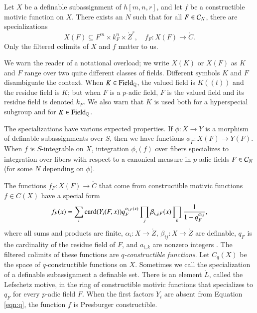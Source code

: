 Let $X$ be a definable subassignment of $h[m,n,r]$, and let $f$ be a
constructible motivic function on $X$.  There exists an $N$ such that
for all $F\in \mathcal C_N$, there are specializations
\[
X(F)\subseteq F^m\times k_F^n\times \ring{Z}^r,  \quad f_F: X(F) \to\ring{C}.
\]
Only the  filtered colimits of $X$ and $f$ matter to us.

We warn the reader of a notational overload; we write $X(K)$ or $X(F)$
as $K$ and $F$ range over two quite different classes of fields.
Different symbols $K$ and $F$ disambiguate the context.  When $K\in
{\operatorname{Field}}_{\mathbb{Q}}$, the valued field is $K((t))$ and the residue field is
$K$; but when $F$ is a $p$-adic field, $F$ is the valued field and its
residue field is denoted $k_F$.  We also warn that $K$ is used both for
a hyperspecial subgroup and for $K\in{\operatorname{Field}}_{\mathbb{Q}}$.

The specializations have various expected properties.  If $\phi:X\to
Y$ is a morphism of definable subassignments over $S$, then we have functions
$\phi_F:X(F)\to Y(F)$.  When $f$ is $S$-integrable on $X$, integration
$\phi_!(f)$ over fibers specializes to integration over fibers with
respect to a canonical measure in $p$-adic fields $F\in \mathcal C_N$ (for
some $N$ depending on $\phi$).

The functions $f_F:X(F)\to\ring{C}$ that come from constructible
motivic functions $f\in C(X)$ have a special form
\begin{equation}\label{eqn:q}
f_F(x) = \sum_i {\operatorname{card}}(Y_i(F,x)) q_F^{\alpha_{i,F}(x)} 
\prod_j \beta_{i,j,F}(x)\prod_k \frac{1}{1-q_F^{a_{i,k}}},
\end{equation}
where all sums and products are finite, $\alpha_{i}:X\to\ring{Z}$,
$\beta_{ij}:X\to\ring{Z}$ are definable, $q_F$ is the cardinality of
the residue field of $F$, and $a_{i,k}$ are nonzero integers
\cite[\S2]{cluckers2011btransfer}.  The filtered colimits of these
functions are {\it $q$-constructible functions}.  Let $C_q(X)$ be the
space of $q$-constructible functions on $X$.  Sometimes we call the
specialization of a definable subassignment a definable set.  There is
an element $\ring{L}$, called the Lefschetz motive, in the ring of
constructible motivic functions that specializes to $q_F$ for every
$p$-adic field $F$.  When the first factors $Y_i$ are absent from
Equation \ref{eqn:q}, the function $f$ is Presburger
constructible.

